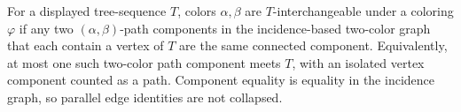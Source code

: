 \begin{definition}
For a displayed tree-sequence \(T\), colors \(\alpha,\beta\) are
\(T\)-interchangeable under a coloring \(\varphi\) if any two
\((\alpha,\beta)\)-path components in the incidence-based two-color graph
that each contain a vertex of \(T\) are the same connected component.
Equivalently, at most one such two-color path component meets \(T\), with
an isolated vertex component counted as a path.
Component equality is equality in the incidence graph, so parallel edge
identities are not collapsed.
\end{definition}
